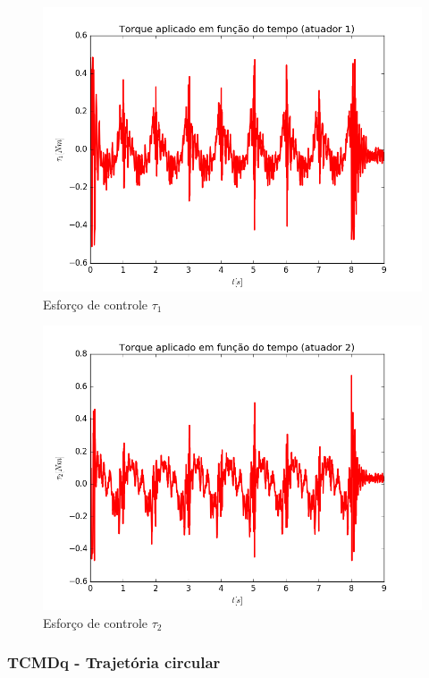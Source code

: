 \documentclass[]{politex}
\begin{document}
\begin{multicols}{2}
\begin{figure}[H]
	\centering
	\includegraphics[scale=0.39]{../../../Experimental/Aquisicoes/CTCt_circulo/tau1.png}  
	\caption{Esforço de controle $\tau_1$}
	\label{fig:CTCq_circulo_tau1}
\end{figure}
\begin{figure}[H]
	\centering
	\includegraphics[scale=0.39]{../../../Experimental/Aquisicoes/CTCt_circulo/tau2.png}  
	\caption{Esforço de controle $\tau_2$}
	\label{fig:CTCq_circulo_tau2}
\end{figure}
\end{multicols}

\subsubsection{TCMDq - Trajetória circular}
\end{document}
